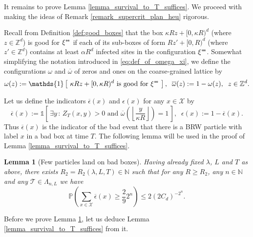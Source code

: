 \documentclass[a4paper,12pt]{article}
\newtheorem  {lemma}         [theorem]{Lemma}
\newcommand{\sstar}{* \hspace{-.05cm} *}
\begin{document}
It remains to prove Lemma \ref{lemma_survival_to_T_suffices}. We proceed with making the ideas of Remark \ref{remark_supercrit_plan_heu} rigorous.

\smallskip

 Recall from Definition \ref{def:good_boxes} that the box $\kappa Rz+[0,\kappa R)^d$ (where $z \in \mathbb{Z}^d$) is good for $\xi^{\sstar}$
 if each of its sub-boxes of form $R z' +[ 0,R)^d$ (where  $z' \in \mathbb{Z}^d$) contains at least $\alpha R^d$ infected sites in the configuration $\xi^{\sstar}$.
  Somewhat simplifying the notation introduced in \eqref{eq:def_of_omega_xi}, we define the configurations $\omega$ and $\overline{\omega}$ of zeros and ones on the coarse-grained lattice by
\begin{equation}\label{def_omega_balazs}
  \omega(z):= \mathds{1}\left[ \text{ $\kappa Rz+[0,\kappa R)^d$  is good for $\xi^{\sstar}$ } \right],
 \; \; \overline{\omega}(z):=1-\omega(z),
   \; \; z \in \mathbb{Z}^d.
\end{equation}


Let us define the indicators $\overline{\epsilon}(x)$ and $\epsilon(x)$ for any  $x \in \mathcal{X}$ by
\begin{equation}\label{def_epsilon_bad_event}
\overline{\epsilon}(x):= \mathds{1} \left[ \, \exists y  \, : \, Z_T(x,y)>0 \text{ and } \overline{\omega}\left( \left\lfloor \frac{y}{\kappa R} \right\rfloor \right)=1 \, \right],
\;\; \epsilon(x):=1-\overline{\epsilon}(x).
\end{equation}
Thus $\overline{\epsilon}(x)$ is the indicator of the bad event that there is a BRW particle with label $x$ in a bad box at time $T$.
The following lemma will be used in the proof of Lemma \ref{lemma_survival_to_T_suffices}.

\begin{lemma}[Few particles land on bad boxes]\label{lemma_ground_is_mostly_fertile}
 Having already fixed $\lambda$, $L$ and $T$ as above, there exists $R_2=R_2(\lambda,L,T) \in \mathbb{N}$ such that for
any $R \geq R_2$, any $n \in \mathbb{N}$ and any $\mathcal{T} \in \Lambda_{n,L}$ we have
\begin{equation}\label{ground_is_mostly_fertile_eq}
 \mathbb{P}\left( \sum_{x \in \mathcal{X} } \overline{\epsilon}(x) \geq \frac{2}{9} 2^n  \right) \leq 2 \left( 2 C_d  \right)^{-2^n}.
\end{equation}
\end{lemma}

Before we prove Lemma \ref{lemma_ground_is_mostly_fertile}, let us deduce Lemma \ref{lemma_survival_to_T_suffices} from it.
\end{document}
